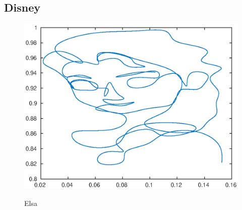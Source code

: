 \documentclass[]{article}
\begin{document}
\subsection*{Disney}
\begin{figure}[H]
\begin{center}
\includegraphics[width=1\textwidth]{elsapoging3.eps}
  \label{elsapoging3}
  \caption{Elsa}
\end{center}
\end{figure}
\end{document}
